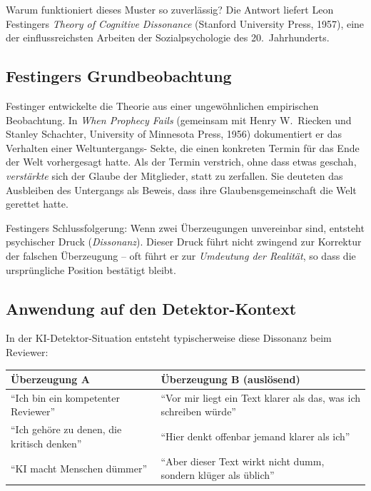 Warum funktioniert dieses Muster so zuverlässig? Die Antwort liefert
Leon Festingers \emph{Theory of Cognitive Dissonance} (Stanford
University Press, 1957), eine der einflussreichsten Arbeiten der
Sozialpsychologie des 20.~Jahrhunderts.

\subsection{Festingers Grundbeobachtung}

Festinger entwickelte die Theorie aus einer ungewöhnlichen
empirischen Beobachtung. In \emph{When Prophecy Fails} (gemeinsam
mit Henry W.~Riecken und Stanley Schachter, University of Minnesota
Press, 1956) dokumentiert er das Verhalten einer Weltuntergangs-
Sekte, die einen konkreten Termin für das Ende der Welt vorhergesagt
hatte. Als der Termin verstrich, ohne dass etwas geschah,
\emph{verstärkte} sich der Glaube der Mitglieder, statt zu
zerfallen. Sie deuteten das Ausbleiben des Untergangs als Beweis,
dass ihre Glaubensgemeinschaft die Welt gerettet hatte.

Festingers Schlussfolgerung: Wenn zwei Überzeugungen unvereinbar
sind, entsteht psychischer Druck (\emph{Dissonanz}). Dieser Druck
führt nicht zwingend zur Korrektur der falschen Überzeugung -- oft
führt er zur \emph{Umdeutung der Realität}, so dass die ursprüngliche
Position bestätigt bleibt.

\subsection{Anwendung auf den Detektor-Kontext}

In der KI-Detektor-Situation entsteht typischerweise diese
Dissonanz beim Reviewer:

\begin{center}
\renewcommand{\arraystretch}{1.3}
{\small
\begin{tabular}{>{\raggedright\arraybackslash}p{5.0cm}>{\raggedright\arraybackslash}p{5.6cm}}
\toprule
\textbf{Überzeugung A} & \textbf{Überzeugung B (auslösend)} \\
\midrule
\enquote{Ich bin ein kompetenter Reviewer} & \enquote{Vor mir liegt ein Text klarer als das, was ich schreiben würde} \\[2pt]
\enquote{Ich gehöre zu denen, die kritisch denken} & \enquote{Hier denkt offenbar jemand klarer als ich} \\[2pt]
\enquote{KI macht Menschen dümmer} & \enquote{Aber dieser Text wirkt nicht dumm, sondern klüger als üblich} \\
\bottomrule
\end{tabular}
}
\renewcommand{\arraystretch}{1.0}
\end{center}

